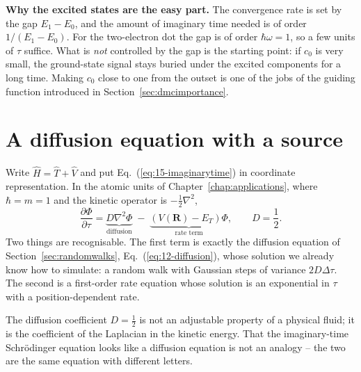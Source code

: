 \begin{notebox}
\textbf{Why the excited states are the easy part.}  The convergence rate is
set by the gap $E_1-E_0$, and the amount of imaginary time needed is of order
$1/(E_1-E_0)$.  For the two-electron dot the gap is of order $\hbar\omega=1$,
so a few units of $\tau$ suffice.  What is \emph{not} controlled by the gap is
the starting point: if $c_0$ is very small, the ground-state signal stays
buried under the excited components for a long time.  Making $c_0$ close to
one from the outset is one of the jobs of the guiding function introduced in
Section~\ref{sec:dmcimportance}.
\end{notebox}

\section{A diffusion equation with a source}
\label{sec:dmcdiffusion}

Write $\hat{H}=\hat{T}+\hat{V}$ and put Eq.~(\ref{eq:15-imaginarytime}) in
coordinate representation.  In the atomic units of
Chapter~\ref{chap:applications}, where $\hbar=m=1$ and the kinetic operator is
$-\tfrac12\nabla^2$,
\begin{equation}
  \frac{\partial \Phi}{\partial \tau}
   = \underbrace{D\nabla^2\Phi}_{\textstyle\text{diffusion}}
   \;-\;\underbrace{\left(V(\bm{R})-E_T\right)\Phi}_{
     \textstyle\text{rate term}},
  \qquad D=\frac{1}{2}.
  \label{eq:15-diffusionsource}
\end{equation}
Two things are recognisable.  The first term is exactly the diffusion equation
of Section~\ref{sec:randomwalks}, Eq.~(\ref{eq:12-diffusion}), whose solution
we already know how to simulate: a random walk with Gaussian steps of variance
$2D\Delta\tau$.  The second is a first-order rate equation whose solution is
an exponential in $\tau$ with a position-dependent rate.

The diffusion coefficient $D=\tfrac12$ is not an adjustable property of a
physical fluid; it is the coefficient of the Laplacian in the kinetic energy.
That the imaginary-time Schr\"odinger equation looks like a diffusion equation
is not an analogy -- the two are the same equation with different letters.

